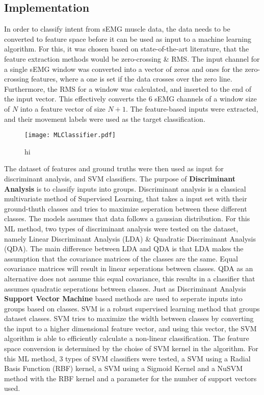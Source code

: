 \documentclass[../main.tex]{subfiles}
\begin{document}
\subsection{Implementation}

In order to classify intent from sEMG muscle data, the data needs to be converted to feature space before it can be used as input to a machine learning algorithm.
For this, it was chosen based on state-of-the-art literature, that the feature extraction methods would be zero-crossing \& RMS.
The input channel for a single sEMG window was converted into a vector of zeros and ones for the zero-crossing features, where a one is set if the data crosses over the zero line.
Furthermore, the RMS for a window was calculated, and inserted to the end of the input vector. This effectively converts the 6 sEMG channels of a window size of $N$ into a feature vector of size $N+1$.
The feature-based inputs were extracted, and their movement labels were used as the target classification.

\begin{figure}[H]
\begin{center}
\texttt{[image: MLClassifier.pdf]}
\caption{hi}
\label{fig:mlclassifier}
\end{center}
\end{figure}

The dataset of features and ground truths were then used as input for discriminant analysis, and SVM classifiers.
The purpose of \textbf{Discriminant Analysis} is to classify inputs into groups.
Discriminant analysis is a classical multivariate method of Supervised Learning, that takes a input set with their ground-thuth classes and tries to maximize seperation between these different classes.
The models assumes that data follows a gaussian distribution. 
For this ML method, two types of discriminant analysis were tested on the dataset, namely
Linear Discriminant Analysis (LDA) \& Quadratic Discriminant Analysis (QDA).
The main difference between LDA and QDA is that LDA makes the assumption that the covariance matrices of the classes are the same.
Equal covariance matrices will result in linear seperations between classes.
QDA as an alternative does not assume this equal covariance, this results in a classifier that assumes quadratic seperations between classes.
Just as Discriminant Analysis \textbf{Support Vector Machine} based methods are used to seperate inputs into groups based on classes.
SVM is a robust supervised learning method that groups dataset classes.
SVM tries to maximize the width between classes by converting the input to a higher dimensional feature vector, and using this vector, the SVM algorithm is able to efficiently calculate a non-linear classification.
The feature space conversion is determined by the choise of SVM kernel in the algorithm.
For this ML method, 3 types of SVM classifiers were tested, a SVM using a Radial Basis Function (RBF) kernel, a SVM using a Sigmoid Kernel and a NuSVM method with the RBF kernel and a parameter for the number of support vectors used.
\end{document}

